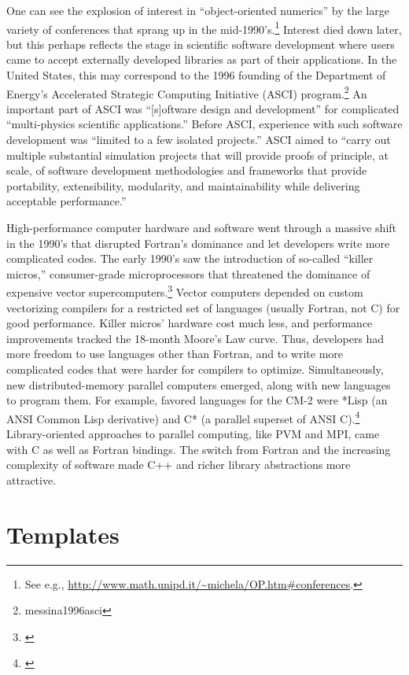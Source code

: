 One can see the explosion of interest in ``object-oriented numerics'' by the large
variety of conferences that sprang up in the mid-1990's.\footnote{See e.g.,
\url{http://www.math.unipd.it/~michela/OP.htm#conferences}.} Interest died
down later, but this perhaps reflects the stage in scientific software development
where users came to accept externally developed libraries as part of their
applications. In the United States, this may correspond to the 1996 founding
of the Department of Energy's Accelerated Strategic Computing Initiative
(ASCI) program.{\footnote{messina1996asci}}
An important part of ASCI was ``[s]oftware design and development''
for complicated ``multi-physics scientific applications.''
Before ASCI, experience with such software development was ``limited to a few
isolated projects.'' ASCI aimed to ``carry out multiple substantial simulation
projects that will provide proofs of principle, at scale, of software development
methodologies and frameworks that provide portability, extensibility, modularity,
and maintainability while delivering acceptable performance.''

High-performance computer hardware and software went through a massive
shift in the 1990's that disrupted Fortran's dominance and let
developers write more complicated codes.  The early 1990's saw the
introduction of so-called ``killer micros,'' consumer-grade
microprocessors that threatened the dominance of expensive vector
supercomputers.\footnote{\cite{killermicros1991}} Vector computers depended
on custom vectorizing compilers for a restricted set of languages
(usually Fortran, not C) for good performance.  Killer micros'
hardware cost much less, and performance improvements tracked the
18-month Moore's Law curve. Thus, developers had more freedom to use
languages other than Fortran, and to write more complicated codes that
were harder for compilers to optimize.  Simultaneously, new
distributed-memory parallel computers emerged, along with new
languages to program them.  For example, favored languages for the
CM-2 were *Lisp (an ANSI Common Lisp derivative) and C* (a parallel
superset of ANSI C).\footnote{\cite{CM2}} Library-oriented approaches
to parallel computing, like PVM and MPI, came with C as well as
Fortran bindings. The switch from Fortran and the increasing
complexity of software made C++ and richer library abstractions more
attractive.

\section{Templates}

